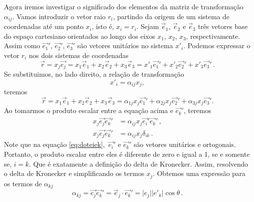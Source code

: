 Agora iremos investigar o significado dos elementos da matriz de transforma\c{c}\~ao
$\alpha_{ij}$. Vamos introduzir o vetor raio $r_{i}$, partindo da
origem de um sistema de coordenadas at\'e um ponto $x_{i}$, isto
\'e, $x_{i}=r_{i}$. Sejam $\vec{e}_{1}$, $\vec{e}_{2}$ e
$\vec{e}_{3}$ tr\^es vetores base do espa\c{c}o cartesiano 
orientados ao longo dos eixos $x_{1}$, $x_{2}$,
$x_{3}$, respectivamente. Assim como $\vec{e_{1}}'$,
$\vec{e_{2}}'$, $\vec{e_{3}}'$ s\~ao vetores unit\'arios no
sistema $x'_{i}$.
Podemos expressar o vetor $r_{i}$ nos dois sistemas de
coordenadas
\begin{equation}
  \vec{r}=x_{j}\vec{e_{j}}=x_{1}\vec{e}_{1}+x_{2}\vec{e}_{2}+x_{3}\vec{e}_{3}=x'_{1}\vec{e_{1}}'+
x'_{2}\vec{e_{2}}'+x'_{3}\vec{e_{3}}'\, .
\end{equation}
Se substituimos, no lado direito, a rela\c{c}\~ao de transforma\c{c}\~ao
\begin{equation}
x'_{i}=\alpha_{ij}x_{j},
\end{equation}
teremos
\begin{equation}
\vec{r}=x_{1}\vec{e}_{1}+x_{2}\vec{e}_{2}+
x_{3}\vec{e}_{3}=\alpha_{1j}x_{j}\vec{e_{1}}'+
\alpha_{2j}x_{j}\vec{e_{2}}'+\alpha_{3j}x_{j}\vec{e_{3}}'.
\end{equation}
Ao tomarmos o produto escalar entre a equa\c{c}\~ao acima e $\vec{e_{k}}'$, teremos
\begin{align}
   x_j\vec{e_{j}} \vec{e_{k}}' &= \alpha_{ij}x_j\vec{e_{i}}'\vec{e_{k}}' \, ,
  \label{eq:doteiek} \\
  x_j\vec{e_{j}}\vec{e_{k}}' &= \alpha_{ij}x_j\delta_{ik} \, .
\end{align}
Note que na equa\c{c}\~ao \ref{eq:doteiek}, $\,\vec{e_{i}}'$ e $\vec{e_{k}}'$ s\~ao vetores 
unit\'arios e ortogonais. Portanto, o
produto escalar entre eles \'e diferente de zero e igual a 1, se e somente se,
$i=k$. Que \'e exatamente a defini\c{c}\~ao do delta de Kronecker.
Assim, resolvendo o delta de Kronecker e simplificando os termos $x_j$.
Obtemos uma express\~ao para os termos de $\alpha_{kj}$
\begin{equation}
  \alpha_{kj}=\vec{e_{j}}\vec{e_{k}}'=\vec{e}_{j} \cdot \vec{e_{k}}' = 
  \lvert e_{j}\rvert\lvert e'_{k}\rvert \cos{\theta} \, .
\end{equation}

